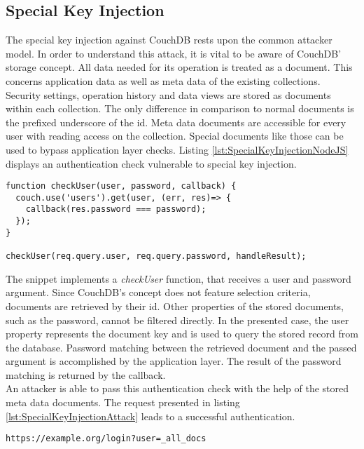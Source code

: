 \subsection{Special Key Injection}
The special key injection against CouchDB rests upon the common attacker model. In order to understand this attack, it is vital to be aware of CouchDB' storage concept. All data needed for its operation is treated as a document. This concerns application data as well as meta data of the existing collections. Security settings, operation history and data views are stored as documents within each collection. The only difference in comparison to normal documents is the prefixed underscore of the id. Meta data documents are accessible for every user with reading access on the collection. Special documents like those can be used to bypass application layer checks. Listing \ref{lst:SpecialKeyInjectionNodeJS} displays an authentication check vulnerable to special key injection. \\

\begin{lstlisting}[caption={Vulnerable NodeJS example for special key injection on CouchDB}, label={lst:SpecialKeyInjectionNodeJS}]
function checkUser(user, password, callback) {
  couch.use('users').get(user, (err, res)=> {
    callback(res.password === password);
  });
}

checkUser(req.query.user, req.query.password, handleResult);
\end{lstlisting}

The snippet implements a \emph{checkUser} function, that receives a user and password argument. Since CouchDB's concept does not feature selection criteria, documents are retrieved by their id. Other properties of the stored documents, such as the password, cannot be filtered directly. In the presented case, the user property represents the document key and is used to query the stored record from the database. Password matching between the retrieved document and the passed argument is accomplished by the application layer. The result of the password matching is returned by the callback. \\

An attacker is able to pass this authentication check with the help of the stored meta data documents. The request presented in listing \ref{lst:SpecialKeyInjectionAttack} leads to a successful authentication.
 
\begin{lstlisting}[caption={Attack vector on CouchDB for speical key injection via HTTP GET}, label={lst:SpecialKeyInjectionAttack}]
https://example.org/login?user=_all_docs
\end{lstlisting}

